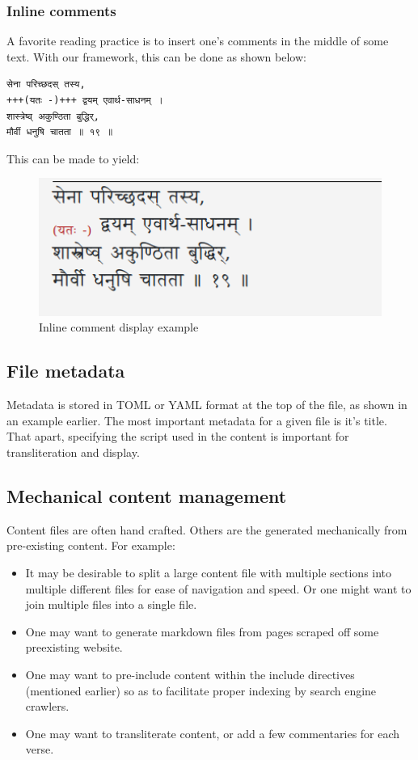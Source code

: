\documentclass[11pt]{article}
\begin{document}
\subsubsection{Inline comments}
A favorite reading practice is to insert one's comments in the middle of some text. With our framework, this can be done as shown below:

\begin{verbatim}
सेना परिच्छदस् तस्य,  
+++(यतः -)+++ द्वयम् एवार्थ-साधनम् ।  
शास्त्रेष्व् अकुण्ठिता बुद्धिर्,  
मौर्वी धनुषि चातता ॥ १९ ॥   
\end{verbatim}

This can be made to yield:


\begin{figure}[h]
\caption{Inline comment display example}
\centering
\includegraphics[width=1.0\textwidth]{images/inline-comment-example}
\end{figure}


\subsection{File metadata}
Metadata is stored in TOML or YAML format at the top of the file, as shown in an example earlier. The most important metadata for a given file is it's title. That apart, specifying the script used in the content is important for transliteration and display.

\subsection{Mechanical content management}
Content files are often hand crafted. Others are the generated mechanically from pre-existing content. For example: 

\begin{itemize}
\tightlist
\item
  It may be desirable to split a large content file with multiple sections into multiple different files for ease of navigation and speed. Or one might want to join multiple files into a single file.
\item
  One may want to generate markdown files from pages scraped off some preexisting website.
\item
  One may want to pre-include content within the include directives (mentioned earlier) so as to facilitate proper indexing by search engine crawlers.
\item
  One may want to transliterate content, or add a few commentaries for each verse.
\end{itemize}
\end{document}
